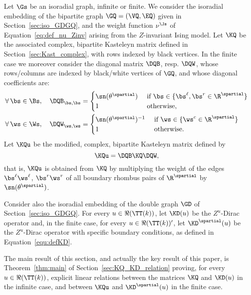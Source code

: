 \documentclass[a4paper,twoside,11pt]{article}
\begin{document}
Let $\Gs$ be an isoradial graph, infinite or finite. We consider the isoradial embedding of the bipartite graph 
$\GQ=(\VQ,\EQ)$ given in Section~\ref{sec:iso_GDGQ}, and 
the weight function $\nu^\Js$ of Equation~\eqref{eq:def_nu_Zinv} arising from the $Z$-invariant Ising model.
Let $\KQ$ be the associated complex, bipartite Kasteleyn matrix defined in Section~\ref{sec:Kast_complex}, with rows indexed by 
black vertices. In the finite case we moreover consider the diagonal matrix $\DQB$, resp. $\DQW$, whose rows/columns are indexed by 
black/white vertices of $\GQ$, and whose diagonal coefficients are:
\begin{align*}
\forall\,\bs\in\Bs,\quad \DQB_{\bs,\bs}&=
\begin{cases}
\sn(\theta^\spartial) & \text{ if $\bs\in\{\bs^\ell,\bs^r\in\R^\spartial\}$}\\
1 & \text{ otherwise},
\end{cases}\\
\forall\,\ws\in\Ws,\quad
\DQW_{\ws,\ws}&=
\begin{cases}
\sn(\theta^\spartial)^{-1} & \text{ if $\ws\in\{\ws^c\in \R^\spartial\}$}\\
1&\text{ otherwise}.
\end{cases}
\end{align*}
Let $\KQu$ be the modified, complex, bipartite Kasteleyn matrix defined by 
\begin{equation}\label{equ:KQ_KQu}
\KQu=\DQB \KQ \DQW,
\end{equation}
that is, $\KQu$ is obtained from $\KQ$ by 
multiplying the weight of the edges $\bs^\ell \ws^\ell$, $\bs^r \ws^r$ of all boundary rhombus pairs of $\R^\spartial$ 
by $\sn(\theta^\spartial)$.

Consider also the isoradial embedding of the double graph $\GD$ of Section~\ref{sec:iso_GDGQ}. For every $u\in\Re(\TT(k))$,
let $\KD(u)$ be the $Z^u$-Dirac operator and, in the finite case, for every $u\in\Re(\TT(k))'$,
let $\KD^\spartial(u)$ be the $Z^u$-Dirac operator with specific boundary conditions, as defined in 
Equation~\eqref{equ:defKD}.

The main result of this section, and actually the key result of this paper, is Theorem~\ref{thm:main} of 
Section~\ref{sec:KQ_KD_relation} proving, for every $u\in\Re(\TT(k))$,
explicit linear relations between the matrices $\KQ$ and $\KD(u)$ in the infinite case, and between $\KQu$ and $\KD^\spartial(u)$ in the finite case.
\end{document}
